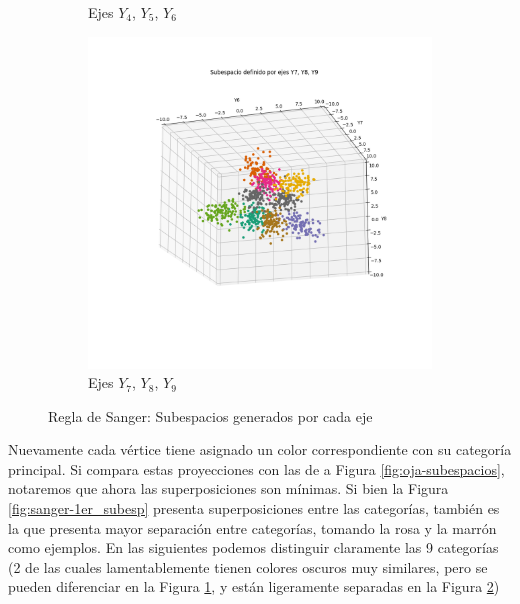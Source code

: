 \documentclass[a4paper,10pt]{article}
\begin{document}
\begin{figure}[H]
\begin{subfigure}{.5\textwidth}
		\caption{Ejes $Y_4$, $Y_5$, $Y_6$}
		\label{fig:sanger-2er_subesp}
	\end{subfigure}
	\begin{center}
		\begin{subfigure}{.5\textwidth}
			\centering
			\includegraphics[width=\textwidth]{imgs/sanger-subespacio-y7_y8_y9.png}
			\caption{Ejes $Y_7$, $Y_8$, $Y_9$}
			\label{fig:sanger-3er_subesp}
		\end{subfigure}
	\end{center}

	\caption{Regla de Sanger: Subespacios generados por cada eje}
	\label{fig:sanger-subespacios}
\end{figure}

Nuevamente cada vértice tiene asignado un color correspondiente con su
categoría principal. Si compara estas proyecciones con las de a Figura
\ref{fig:oja-subespacios}, notaremos que ahora las superposiciones son
mínimas. Si bien la Figura \ref{fig:sanger-1er_subesp} presenta
superposiciones entre las categorías, también es la que presenta mayor
separación entre categorías, tomando la rosa y la marrón como ejemplos. En las
siguientes podemos distinguir claramente las 9 categorías (2 de las cuales
lamentablemente tienen colores oscuros muy similares, pero se pueden diferenciar
en la Figura \ref{fig:sanger-2er_subesp}, y están ligeramente separadas en la
Figura \ref{fig:sanger-3er_subesp})
\end{document}
